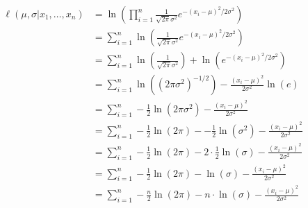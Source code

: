 \begin{align}  
    \ell(\mu, \sigma | x_1, \ldots, x_n) &= \ln(\prod_{i=1}^n \frac{1}{\sqrt{2\pi}\sigma^2} e^{-(x_i-\mu)^2/2\sigma^2}) \\
    &= \sum_{i=1}^n \ln(\frac{1}{\sqrt{2\pi}\sigma^2} e^{-(x_i-\mu)^2/2\sigma^2}) \\
    &= \sum_{i=1}^n \ln(\frac{1}{\sqrt{2\pi}\sigma^2}) + \ln(e^{-(x_i-\mu)^2/2\sigma^2}) \\
    &= \sum_{i=1}^n \ln((2\pi\sigma^2)^{-1/2}) - \frac{(x_i-\mu)^2}{2\sigma^2}\ln(e) \\
    &= \sum_{i=1}^n -\frac{1}{2}\ln(2\pi\sigma^2) - \frac{(x_i-\mu)^2}{2\sigma^2} \\
    &= \sum_{i=1}^n -\frac{1}{2}\ln(2\pi)--\frac{1}{2}\ln(\sigma^2) - \frac{(x_i-\mu)^2}{2\sigma^2} \\
    &= \sum_{i=1}^n -\frac{1}{2}\ln(2\pi)-2\cdot\frac{1}{2}\ln(\sigma) - \frac{(x_i-\mu)^2}{2\sigma^2} \\
    &= \sum_{i=1}^n -\frac{1}{2}\ln(2\pi)-\ln(\sigma) - \frac{(x_i-\mu)^2}{2\sigma^2} \\
    &= \sum_{i=1}^n -\frac{n}{2}\ln(2\pi)- n \cdot \ln(\sigma) - \frac{(x_i-\mu)^2}{2\sigma^2} 
\end{align}